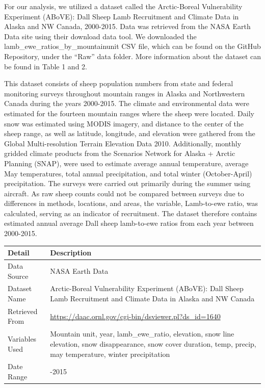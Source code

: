 \documentclass[
  12pt,
]{article}
\begin{document}
For our analysis, we utilized a dataset called the Arctic-Boreal
Vulnerability Experiment (ABoVE): Dall Sheep Lamb Recruitment and
Climate Data in Alaska and NW Canada, 2000-2015. Data was retrieved from
the NASA Earth Data site using their download data tool. We downloaded
the lamb\_ewe\_ratios\_by\_mountainunit CSV file, which can be found on
the GitHub Repository, under the ``Raw'' data folder. More information
about the dataset can be found in Table 1 and 2.

This dataset consists of sheep population numbers from state and federal
monitoring surveys throughout mountain ranges in Alaska and Northwestern
Canada during the years 2000-2015. The climate and environmental data
were estimated for the fourteen mountain ranges where the sheep were
located. Daily snow was estimated using MODIS imagery, and distance to
the center of the sheep range, as well as latitude, longitude, and
elevation were gathered from the Global Multi-resolution Terrain
Elevation Data 2010. Additionally, monthly gridded climate products from
the Scenarios Network for Alaska + Arctic Planning (SNAP), were used to
estimate average annual temperature, average May temperatures, total
annual precipitation, and total winter (October-April) precipitation.
The surveys were carried out primarily during the summer using aircraft.
As raw sheep counts could not be compared between surveys due to
differences in methods, locations, and areas, the variable, Lamb-to-ewe
ratio, was calculated, serving as an indicator of recruitment. The
dataset therefore contains estimated annual average Dall sheep
lamb-to-ewe ratios from each year between 2000-2015.

\begin{longtable}[]{@{}
  >{\raggedright\arraybackslash}p{}
  >{\raggedright\arraybackslash}p{}@{}}
\toprule
Detail & Description \\
\midrule
\endhead
Data Source & NASA Earth Data \\
Dataset Name & Arctic-Boreal Vulnerability Experiment (ABoVE): Dall
Sheep Lamb Recruitment and Climate Data in Alaska and NW Canada \\
Retrieved From &
\url{https://daac.ornl.gov/cgi-bin/dsviewer.pl?ds_id=1640} \\
Variables Used & Mountain unit, year, lamb\_ewe\_ratio, elevation, snow
line elevation, snow disappearance, snow cover duration, temp, precip,
may temperature, winter precipitation \\
Date Range & 2000-2015 \\
\bottomrule
\end{longtable}
\end{document}
